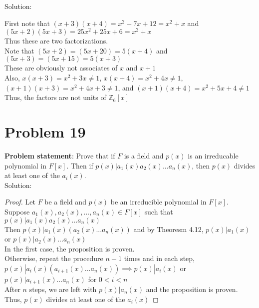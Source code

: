 \documentclass{article} %
\begin{document}
Solution: 
\begin{addmargin}[1em]{0em}
First note that $(x + 3)(x+4) = x^2 + 7x + 12 = x^2 + x$ and $(5x + 2)(5x + 3) = 25x^2 + 25x + 6 = x^2 + x$
\\Thus these are two factorizations.
\\Note that $(5x + 2) = (5x + 20) = 5(x+4)$ and $(5x + 3) = (5x + 15) = 5(x + 3)$
\\These are obviously not associates of $x$ and $x+1$
\\Also, $x(x+3) = x^2 + 3x \neq 1$, $x(x+4) = x^2 + 4x \neq 1$, $(x+1)(x+3) = x^2 + 4x + 3 \neq 1$, and $(x+1)(x+4) = x^2 + 5x + 4 \neq 1$
\\Thus, the factors are not units of $\mathbb{Z}_6[x]$
\end{addmargin}

\newpage

\section*{Problem 19}


\textbf{Problem statement}: Prove that if $F$ is a field and $p(x)$ is an irreducable polynomial in $F[x]$.  Then if $p(x)|a_1(x)a_2(x)...a_n(x)$, then $p(x)$ divides at least one of the $ a_i(x)$.
\\

Solution: 
\begin{addmargin}[1em]{0em}
\begin{proof}
Let $F$ be a field and $p(x)$ be an irreducible polynomial in $F[x]$.
\\Suppose $a_1(x),a_2(x),...,a_n(x) \in F[x]$ such that $p(x)|a_1(x)a_2(x)...a_n(x)$
\\Then $p(x)|a_1(x)(a_2(x)...a_n(x))$ and by Theoresm 4.12, $p(x)|a_1(x)$ or $p(x)|a_2(x)...a_n(x)$
\\In the first case, the proposition is proven.
\\Otherwise, repeat the procedure $n-1$ times and in each step, $p(x)|a_i(x)(a_{i+1}(x)...a_n(x)) \implies p(x)|a_i(x)$ or $p(x)|a_{i+1}(x)...a_n(x)$ for $0< i < n$
\\After $n$ steps, we are left with $p(x)|a_n(x)$ and the proposition is proven.
\\Thus, $p(x)$ divides at least one of the $a_i(x)$
\end{proof}
\end{addmargin}
\end{document}
